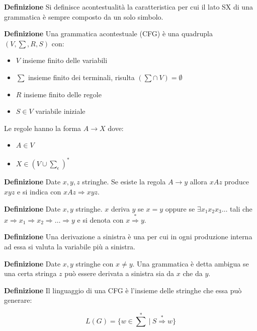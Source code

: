 \documentclass{article}
\newcommand{\arrowstar}{\overset{*}{\Rightarrow}}
\begin{document}
\noindent\textbf{Definizione} Si definisce acontestualità la caratteristica per cui il lato SX di una grammatica è sempre composto da un solo simbolo.\newline

\noindent\textbf{Definizione} Una grammatica acontestuale (CFG) è una quadrupla $(V,\sum,R,S)$ con:
\begin{itemize}
    \item $V$ insieme finito delle variabili
    \item $\sum$ insieme finito dei terminali, risulta $(\sum \cap\ V)=\emptyset$
    \item $R$ insieme finito delle regole
    \item $S\in V$ variabile iniziale\newline
\end{itemize}

\noindent Le regole hanno la forma $A\rightarrow X$ dove:
\begin{itemize}
    \item $A\in V$
    \item $X\in(V\cup \sum_\epsilon)^*$\newline
\end{itemize}

\noindent \textbf{Definizione} Date $x,y,z$ stringhe. Se esiste la regola $A\rightarrow y$ allora $xAz$ produce $xyz$ e si indica con $xAz\Rightarrow xyz$.\newline

\noindent \textbf{Definizione} Date $x,y$ stringhe. $x$ deriva $y$ se $x=y$ oppure se $\exists x_1x_2x_3\ldots$ tali che $x\Rightarrow x_1\Rightarrow x_2\Rightarrow \ldots \Rightarrow y$ e si denota con $x\arrowstar y$.\newline

\noindent \textbf{Definizione} Una derivazione a sinistra è una per cui in ogni produzione interna ad essa si valuta la variabile più a sinistra.\newline

\noindent \textbf{Definizione} Date $x,y$ stringhe con $x\neq y$. Una grammatica è detta ambigua se una certa stringa $z$ può essere derivata a sinistra sia da $x$ che da $y$.

\newpage

\noindent \textbf{Definizione} Il linguaggio di una CFG è l'insieme delle stringhe che essa può generare:

$$L(G)=\{w\in{\sum}^*\ |\ S \arrowstar w\}$$\newline
\end{document}

